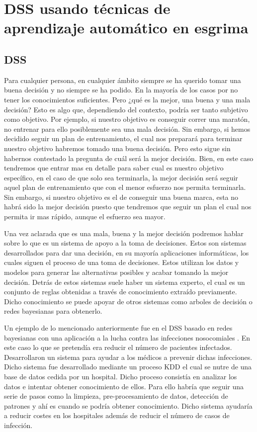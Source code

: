 \newline

\section{\acs{DSS} usando técnicas de aprendizaje automático en esgrima}
\subsection{\acl{DSS}}

Para cualquier persona, en cualquier ámbito siempre se ha querido tomar una buena decisión y no siempre se ha podido. En la mayoría de los casos
 por no tener los conocimientos suficientes. Pero ¿qué es la mejor, una buena y una mala decisión?
 Esto es algo que, dependiendo del contexto, podría ser tanto subjetivo como objetivo. Por ejemplo, si nuestro
 objetivo es conseguir correr una maratón, no entrenar para ello posiblemente sea una mala decisión.
 Sin embargo, si hemos decidido seguir un plan de entrenamiento, el cual nos preparará para terminar
 nuestro objetivo habremos tomado una buena decisión. Pero esto sigue sin habernos contestado la pregunta
 de cuál será la mejor decisión. Bien, en este caso tendremos que entrar mas en detalle para saber
 cual es nuestro objetivo específico, en el caso de que solo sea terminarla, la mejor decisión será seguir aquel
 plan de entrenamiento que con el menor esfuerzo nos permita terminarla. Sin embargo, si nuestro objetivo
 es el de conseguir una buena marca, esta no habrá sido la mejor decisión puesto que tendremos que
 seguir un plan el cual nos permita ir mas rápido, aunque el esfuerzo sea mayor.

Una vez aclarada que es una mala, buena y la mejor decisión podremos hablar sobre lo que es un sistema
 de apoyo a la toma de decisiones. Estos son sistemas desarrollados para dar una decisión, en su mayoría
 aplicaciones informáticas, los cuales siguen el proceso de una toma de decisiones. Estos utilizan
 los datos y modelos para generar las alternativas posibles y acabar tomando la mejor decisión. Detrás
 de estos sistemas suele haber un sistema experto, el cual es un conjunto de reglas obtenidas
 a través de conocimiento extraído previamente. Dicho conocimiento se puede apoyar de otros sistemas como
 arboles de decisión o redes bayesianas para obtenerlo.

Un ejemplo de lo mencionado anteriormente fue en el \acs{DSS} basado en redes bayesianas con una aplicación
 a la lucha contra las infecciones nosocomiales \cite{hela}. En este caso lo que se pretendía
 era reducir el número de pacientes infectados. Desarrollaron un sistema para ayudar a los
 médicos a prevenir dichas infecciones. Dicho sistema fue desarrollado mediante un proceso \acf{KDD} el
 cual se nutre de una base de datos cedida por un hospital. Dicho proceso consistía en analizar los datos
 e intentar obtener conocimiento de ellos. Para ello habría que seguir una serie de pasos como la
 limpieza, pre-procesamiento de datos, detección de patrones y ahí es cuando se podría obtener conocimiento.
 Dicho sistema ayudaría a reducir costes en los hospitales además de reducir el número de casos de infección.

